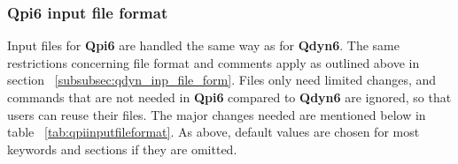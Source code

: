 \documentclass[a4paper,11pt]{article}
\let\origref\ref
\def\ref#1{\unskip~\origref{#1}}
\begin{document}
\begin{longtable}{|p{78pt}|p{158pt}|p{158pt}|}
\hline
\end{longtable}
\normalsize

\subsubsection{\textbf{Qpi6} input file format}\label{subsubsec:qpi_inp_file_form}
Input files for \textbf{Qpi6} are handled the same way as for \textbf{Qdyn6}. 
The same restrictions concerning file format and comments apply as outlined above in
section \ref{subsubsec:qdyn_inp_file_form}. Files only need limited changes,
and commands that are not needed in \textbf{Qpi6} compared to \textbf{Qdyn6} are ignored,
so that users can reuse their files. The major changes needed are mentioned below in table
\ref{tab:qpiinputfileformat}. As above, default values are chosen for most keywords
and sections if they are omitted.
\small
\end{document}
